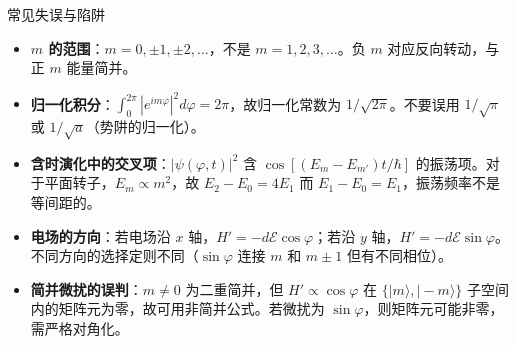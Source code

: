 \begin{errorbox}{常见失误与陷阱}
\begin{itemize}
    \item \textbf{$m$ 的范围}：$m=0,\pm1,\pm2,\ldots$，不是 $m=1,2,3,\ldots$。负 $m$ 对应反向转动，与正 $m$ 能量简并。
    \item \textbf{归一化积分}：$\int_0^{2\pi}|e^{im\varphi}|^2d\varphi=2\pi$，故归一化常数为 $1/\sqrt{2\pi}$。不要误用 $1/\sqrt{\pi}$ 或 $1/\sqrt{a}$（势阱的归一化）。
    \item \textbf{含时演化中的交叉项}：$|\psi(\varphi,t)|^2$ 含 $\cos[(E_m-E_{m'})t/\hbar]$ 的振荡项。对于平面转子，$E_m\propto m^2$，故 $E_2-E_0=4E_1$ 而 $E_1-E_0=E_1$，振荡频率不是等间距的。
    \item \textbf{电场的方向}：若电场沿 $x$ 轴，$H'=-d\mathcal{E}\cos\varphi$；若沿 $y$ 轴，$H'=-d\mathcal{E}\sin\varphi$。不同方向的选择定则不同（$\sin\varphi$ 连接 $m$ 和 $m\pm1$ 但有不同相位）。
    \item \textbf{简并微扰的误判}：$m\neq0$ 为二重简并，但 $H'\propto\cos\varphi$ 在 $\{|m\rangle,|-m\rangle\}$ 子空间内的矩阵元为零，故可用非简并公式。若微扰为 $\sin\varphi$，则矩阵元可能非零，需严格对角化。
\end{itemize}
\end{errorbox}

